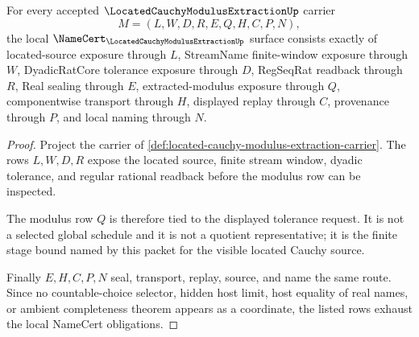 \begin{theorem}
\label{thm:located-cauchy-modulus-extraction-namecert-obligations}
For every accepted $\LocatedCauchyModulusExtractionUp$ carrier
$$
M=(L,W,D,R,E,Q,H,C,P,N),
$$
the local $\NameCert_{\LocatedCauchyModulusExtractionUp}$ surface consists exactly of located-source exposure through $L$, StreamName finite-window exposure through $W$, DyadicRatCore tolerance exposure through $D$, RegSeqRat readback through $R$, Real sealing through $E$, extracted-modulus exposure through $Q$, componentwise transport through $H$, displayed replay through $C$, provenance through $P$, and local naming through $N$.
\end{theorem}
\begin{proof}
Project the carrier of \autoref{def:located-cauchy-modulus-extraction-carrier}. The rows $L,W,D,R$ expose the located source, finite stream window, dyadic tolerance, and regular rational readback before the modulus row can be inspected.

The modulus row $Q$ is therefore tied to the displayed tolerance request. It is not a selected global schedule and it is not a quotient representative; it is the finite stage bound named by this packet for the visible located Cauchy source.

Finally $E,H,C,P,N$ seal, transport, replay, source, and name the same route. Since no countable-choice selector, hidden host limit, host equality of real names, or ambient completeness theorem appears as a coordinate, the listed rows exhaust the local NameCert obligations.
\end{proof}

